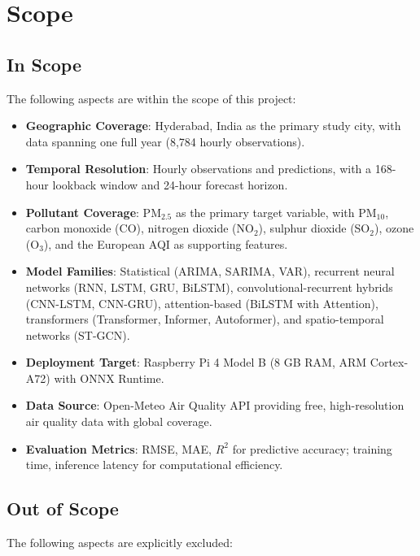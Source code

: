 \section{Scope}

\subsection{In Scope}

The following aspects are within the scope of this project:

\begin{itemize}
    \item \textbf{Geographic Coverage}: Hyderabad, India as the primary study city, with data spanning one full year (8,784 hourly observations).
    \item \textbf{Temporal Resolution}: Hourly observations and predictions, with a 168-hour lookback window and 24-hour forecast horizon.
    \item \textbf{Pollutant Coverage}: PM$_{2.5}$ as the primary target variable, with PM$_{10}$, carbon monoxide (CO), nitrogen dioxide (NO$_2$), sulphur dioxide (SO$_2$), ozone (O$_3$), and the European AQI as supporting features.
    \item \textbf{Model Families}: Statistical (ARIMA, SARIMA, VAR), recurrent neural networks (RNN, LSTM, GRU, BiLSTM), convolutional-recurrent hybrids (CNN-LSTM, CNN-GRU), attention-based (BiLSTM with Attention), transformers (Transformer, Informer, Autoformer), and spatio-temporal networks (ST-GCN).
    \item \textbf{Deployment Target}: Raspberry Pi 4 Model B (8 GB RAM, ARM Cortex-A72) with ONNX Runtime.
    \item \textbf{Data Source}: Open-Meteo Air Quality API providing free, high-resolution air quality data with global coverage.
    \item \textbf{Evaluation Metrics}: RMSE, MAE, $R^2$ for predictive accuracy; training time, inference latency for computational efficiency.
\end{itemize}

\subsection{Out of Scope}

The following aspects are explicitly excluded:

